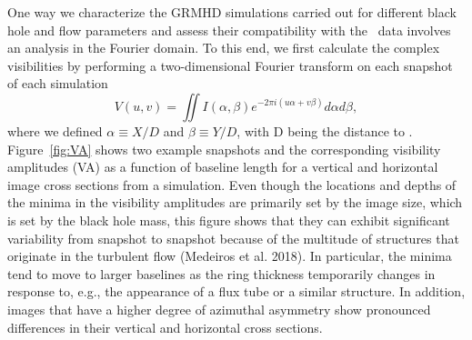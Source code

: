 \documentclass[twocolumn,tighten,dvipsnames,linenumbers]{aastex63}
\begin{document}
One way we characterize the GRMHD simulations carried out for different
black hole and flow parameters and assess their compatibility
with the \sgra\ data involves an analysis in the Fourier domain. To this
end, we first calculate the complex visibilities by performing a
two-dimensional Fourier transform on each snapshot of each simulation
\begin{equation}
V(u,v) = \iint I(\alpha,\beta) e^{-2\pi i(u\alpha+v\beta)}d\alpha d\beta,
\end{equation}
where we defined $\alpha \equiv X/D$ and $\beta \equiv Y/D$, with D
being the distance to \sgra. Figure~\ref{fig:VA} shows two example
snapshots and the corresponding visibility amplitudes (VA) as a
function of baseline length for a vertical and horizontal image cross
sections from a simulation. Even though the locations and depths of
the minima in the visibility amplitudes are primarily set by the image
size, which is set by the black hole mass, this figure shows that they
can exhibit significant variability from snapshot to snapshot because
of the multitude of structures that originate in the turbulent flow
(Medeiros et al. 2018). In particular, the minima tend to move to
larger baselines as the ring thickness temporarily changes in response
to, e.g., the appearance of a flux tube or a similar structure. In
addition, images that have a higher degree of azimuthal asymmetry show
pronounced differences in their vertical and horizontal cross
sections.
\end{document}

